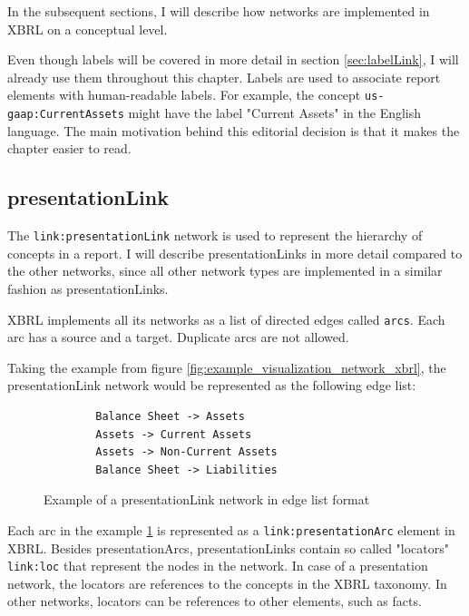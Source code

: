 In the subsequent sections, I will describe how networks are implemented in XBRL on a conceptual level. 

Even though labels will be covered in more detail in section \ref{sec:labelLink}, I will already use them throughout this chapter.
Labels are used to associate report elements with human-readable labels.
For example, the concept \texttt{us-gaap:CurrentAssets} might have the label "Current Assets" in the English language.
The main motivation behind this editorial decision is that it makes the chapter easier to read.



\subsection{presentationLink}

The \texttt{link:presentationLink} network is used to represent the hierarchy of concepts in a report.
I will describe presentationLinks in more detail compared to the other networks, 
since all other network types are implemented in a similar fashion as presentationLinks.

XBRL implements all its networks as a list of directed edges called \texttt{arcs}.
Each arc has a source and a target. Duplicate arcs are not allowed.

Taking the example from figure \ref{fig:example_visualization_network_xbrl}, the presentationLink network would be represented as the following edge list:

\begin{figure}[H]
    \caption{Example of a presentationLink network in edge list format}
    \label{fig:example_visualization_network_xbrl_edge_list}
    \begin{verbatim}
        Balance Sheet -> Assets
        Assets -> Current Assets
        Assets -> Non-Current Assets
        Balance Sheet -> Liabilities
    \end{verbatim}
\end{figure}

Each arc in the example \ref{fig:example_visualization_network_xbrl_edge_list} is represented as a \texttt{link:presentationArc} element in XBRL.
Besides presentationArcs, presentationLinks contain so called "locators" \texttt{link:loc} that represent the nodes in the network.
In case of a presentation network, the locators are references to the concepts in the XBRL taxonomy. 
In other networks, locators can be references to other elements, such as facts.

